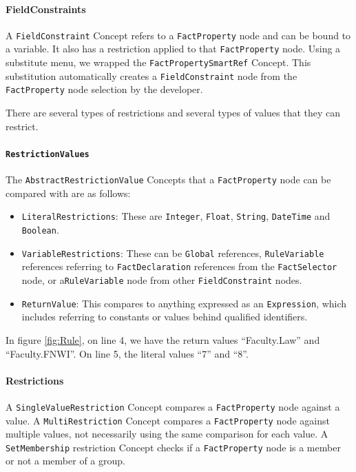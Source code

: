 \paragraph{FieldConstraints} A \texttt{FieldConstraint} Concept refers to a \texttt{FactProperty} node and can be bound to a variable.
It also has a restriction applied to that \texttt{FactProperty} node.
Using a substitute menu, we wrapped the \texttt{FactPropertySmartRef} Concept.
This substitution automatically creates a \texttt{FieldConstraint} node from the \texttt{FactProperty} node selection by the developer.

There are several types of restrictions and several types of values that they can restrict.

\paragraph{\texttt{RestrictionValues}} The \texttt{AbstractRestrictionValue} Concepts that a \texttt{FactProperty} node can be compared with are as follows:
\begin{itemize}    
    \setlength\itemsep{0em}
    \item \texttt{LiteralRestrictions}: These are \texttt{Integer}, \texttt{Float}, \texttt{String}, \texttt{DateTime} and \texttt{Boolean}.
    \item \texttt{VariableRestrictions}: These can be \texttt{Global} references, \texttt{RuleVariable} references referring to \texttt{FactDeclaration} references from the \texttt{FactSelector} node, or  a\texttt{RuleVariable} node from other \texttt{FieldConstraint} nodes.
    \item \texttt{ReturnValue}: This compares to anything expressed as an \texttt{Expression}, which includes referring to constants or values behind qualified identifiers.
\end{itemize}

In figure \ref{fig:Rule}, on line 4, we have the return values ``Faculty.Law'' and ``Faculty.FNWI''.
On line 5, the literal values ``7'' and ``8''.

\paragraph{Restrictions} A \texttt{SingleValueRestriction} Concept compares a \texttt{FactProperty} node against a value.
A \texttt{MultiRestriction} Concept compares a \texttt{FactProperty} node against multiple values, not necessarily using the same comparison for each value.
A \texttt{SetMembership} restriction Concept checks if a \texttt{FactProperty} node is a member or not a member of a group.

